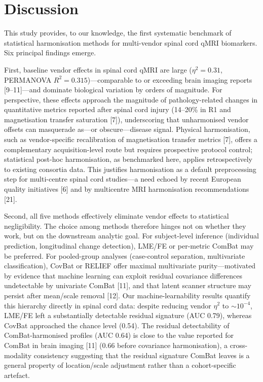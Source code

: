 \documentclass[12pt,a4paper]{article}
\begin{document}
\section{Discussion}

This study provides, to our knowledge, the first systematic benchmark of statistical harmonisation methods for multi-vendor spinal cord qMRI biomarkers. Six principal findings emerge.

First, baseline vendor effects in spinal cord qMRI are large ($\eta^2=0.31$, PERMANOVA $R^2=0.315$)---comparable to or exceeding brain imaging reports [9--11]---and dominate biological variation by orders of magnitude. For perspective, these effects approach the magnitude of pathology-related changes in quantitative metrics reported after spinal cord injury (14--20\% in R1 and magnetisation transfer saturation [7]), underscoring that unharmonised vendor offsets can masquerade as---or obscure---disease signal. Physical harmonisation, such as vendor-specific recalibration of magnetisation transfer metrics [7], offers a complementary acquisition-level route but requires prospective protocol control; statistical post-hoc harmonisation, as benchmarked here, applies retrospectively to existing consortia data. This justifies harmonisation as a default preprocessing step for multi-centre spinal cord studies---a need echoed by recent European quality initiatives [6] and by multicentre MRI harmonisation recommendations [21].

Second, all five methods effectively eliminate vendor effects to statistical negligibility. The choice among methods therefore hinges not on whether they work, but on the downstream analytic goal. For subject-level inference (individual prediction, longitudinal change detection), LME/FE or per-metric ComBat may be preferred. For pooled-group analyses (case-control separation, multivariate classification), CovBat or RELIEF offer maximal multivariate purity---motivated by evidence that machine learning can exploit residual covariance differences undetectable by univariate ComBat [11], and that latent scanner structure may persist after mean/scale removal [12]. Our machine-learnability results quantify this hierarchy directly in spinal cord data: despite reducing vendor $\eta^2$ to ${\sim}10^{-4}$, LME/FE left a substantially detectable residual signature (AUC 0.79), whereas CovBat approached the chance level (0.54). The residual detectability of ComBat-harmonised profiles (AUC 0.64) is close to the value reported for ComBat in brain imaging [11] (0.66 before covariance harmonisation), a cross-modality consistency suggesting that the residual signature ComBat leaves is a general property of location/scale adjustment rather than a cohort-specific artefact.
\end{document}

